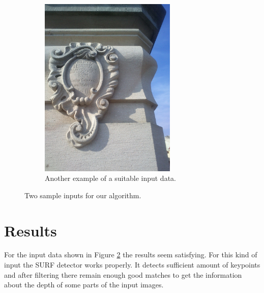 \begin{figure}[H]
\begin{subfigure}[b]{0.45\textwidth}
\centering
\includegraphics[width=6.5cm]{img/memorial_b.png}
\caption{Another example of a suitable input data.} \label{sample2}
\end{subfigure}
\caption{Two sample inputs for our algorithm.}
\label{fig:input_samples}
\end{figure}





\section{Results}
For the input data shown in Figure \ref{fig:input_samples} the results seem satisfying.
For this kind of input the SURF detector works properly.
It detects sufficient amount of keypoints and after filtering there remain enough good matches to get the information about the depth of some parts of the input images.

